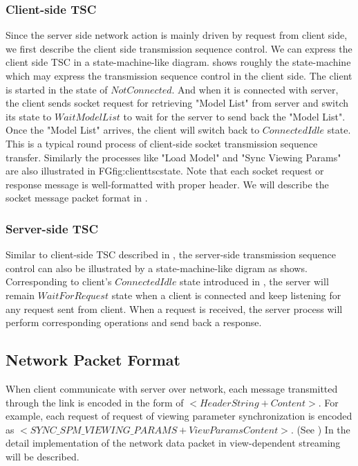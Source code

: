 \subsubsection{Client-side TSC}
\label{section:clienttsc}

Since the server side network action is mainly driven by request from client side, we first describe the client side transmission sequence control. We can express the client side TSC in a state-machine-like diagram.  shows roughly the state-machine which may express the transmission sequence control in the client side. The client is started in the state of $NotConnected$. And when it is connected with server, the client sends socket request for retrieving "Model List" from server and switch its state to $WaitModelList$ to wait for the server to send back the "Model List". Once the "Model List" arrives, the client will switch back to $ConnectedIdle$ state. This is a typical round process of client-side socket transmission sequence transfer. Similarly the processes like "Load Model" and "Sync Viewing Params" are also illustrated in FG{fig:clienttscstate}. Note that each socket request or response message is well-formatted with proper header. We will describe the socket message packet format in .  


\subsubsection{Server-side TSC}
\label{section:servertsc}

Similar to client-side TSC described in , the server-side transmission sequence control can also be illustrated by a state-machine-like digram as  shows. Corresponding to client's $ConnectedIdle$ state introduced in , the server will remain $WaitForRequest$ state when a client is connected and keep listening for any request sent from client. When a request is received, the server process will perform corresponding operations and send back a response. \\

\subsection{Network Packet Format}
\label{section:netpackformat}

When client communicate with server over network, each message transmitted through the link is encoded in the form of $<HeaderString+Content>$. For example, each request of request of viewing parameter synchronization is encoded as $<SYNC\_SPM\_VIEWING\_PARAMS+ViewParamsContent>$. (See ) In  the detail implementation of the network data packet in view-dependent streaming will be described.

